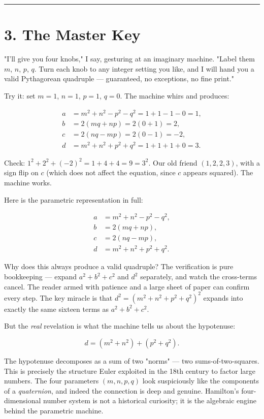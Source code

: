 \documentclass[12pt, letterpaper, openany]{book}
\theoremstyle{definition}
\theoremstyle{remark}
\begin{document}
\bigskip\noindent\rule{\textwidth}{0.4pt}\bigskip



\section*{3. The Master Key}


"I'll give you four knobs," I say, gesturing at an imaginary machine. "Label them $m$, $n$, $p$, $q$. Turn each knob to any integer setting you like, and I will hand you a valid Pythagorean quadruple --- guaranteed, no exceptions, no fine print."

Try it: set $m = 1$, $n = 1$, $p = 1$, $q = 0$. The machine whirs and produces:

\[
\begin{aligned}
a &= m^2 + n^2 - p^2 - q^2 = 1 + 1 - 1 - 0 = 1, \\
b &= 2(mq + np) = 2(0 + 1) = 2, \\
c &= 2(nq - mp) = 2(0 - 1) = -2, \\
d &= m^2 + n^2 + p^2 + q^2 = 1 + 1 + 1 + 0 = 3.
\end{aligned}
\]

Check: $1^2 + 2^2 + (-2)^2 = 1 + 4 + 4 = 9 = 3^2$. Our old friend $(1, 2, 2, 3)$, with a sign flip on $c$ (which does not affect the equation, since $c$ appears squared). The machine works.

Here is the parametric representation in full:

\[
\boxed{\begin{aligned}
a &= m^2 + n^2 - p^2 - q^2, \\
b &= 2(mq + np), \\
c &= 2(nq - mp), \\
d &= m^2 + n^2 + p^2 + q^2.
\end{aligned}}
\]

Why does this always produce a valid quadruple? The verification is pure bookkeeping --- expand $a^2 + b^2 + c^2$ and $d^2$ separately, and watch the cross-terms cancel. The reader armed with patience and a large sheet of paper can confirm every step. The key miracle is that $d^2 = (m^2 + n^2 + p^2 + q^2)^2$ expands into exactly the same sixteen terms as $a^2 + b^2 + c^2$.

But the \textit{real} revelation is what the machine tells us about the hypotenuse:

\[
d = (m^2 + n^2) + (p^2 + q^2).
\]

The hypotenuse decomposes as a sum of two "norms" --- two sums-of-two-squares. This is precisely the structure Euler exploited in the 18th century to factor large numbers. The four parameters $(m, n, p, q)$ look suspiciously like the components of a \textit{quaternion}, and indeed the connection is deep and genuine. Hamilton's four-dimensional number system is not a historical curiosity; it is the algebraic engine behind the parametric machine.
\end{document}
